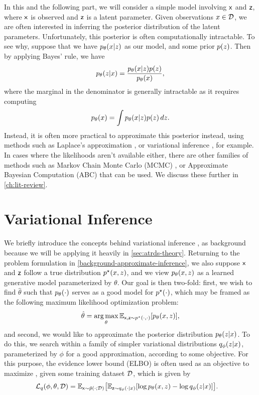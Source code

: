 In this and the following part, we will consider a simple model involving $\mathsf x$ and $\mathsf z$, where $\mathsf x$ is observed and $\mathsf z$ is a latent parameter. Given observations $x\in \mathcal D$, we are often interested in inferring the posterior distribution of the latent parameters. Unfortunately, this posterior is often computationally intractable. To see why, suppose that we have $\pld{x\given z}$ as our model, and some prior $\pd{z}$. Then by applying Bayes' rule, we have
\begin{equation}
    \pld{z\given x} = \frac{\pld{x\given z}\pd{z}}{\pld{x}},
\end{equation}
where the marginal in the denominator is generally intractable as it requires computing
\begin{equation}
    \pld{x} = \int \pld{x\given z}\pd{z} \,dz.
\end{equation}
Instead, it is often more practical to approximate this posterior instead, using methods such as Laplace's approximation \cite{laplace1776}, or variational inference \cite{blei2017variational}, for example. In cases where the likelihoods aren't available either, there are other families of methods such as Markov Chain Monte Carlo (MCMC) \cite{metropolis_1953}, or Approximate Bayesian Computation (ABC) \cite{abc_2013} that can be used. We discuss these further in \cref{ch:lit-review}.


\section{Variational Inference}
\label{background-variational-inference}

We briefly introduce the concepts behind variational inference \cite{blei2017variational}, as background because we will be applying it heavily in \cref{sec:atrds-theory}. Returning to the problem formulation in \cref{background-approximate-inference}, we also suppose $\mathsf x$ and $\mathsf z$ follow a true distribution $\ptd{x,z}$, and we view $\pld{x,z}$ as a learned generative model parameterized by $\theta$. Our goal is then two-fold: first, we wish to find $\hat\theta$ such that $\pld{\cdot}$ serves as a good model for $\ptd{\cdot}$, which may be framed as the following maximum likelihood optimization problem:
\begin{equation}
    \hat\theta = \argmax_{\theta} \EX{\rx,\rz\sim \ptd{\cdot,\cdot}}{\pld{x,z}},
\end{equation}
and second, we would like to approximate the posterior distribution $\pld{z\given x}$. To do this, we search within a family of simpler variational distributions $\qvd{z\given x}$, parameterized by $\phi$ for a good approximation, according to some objective. For this purpose, the evidence lower bound (ELBO) is often used as an objective to maximize \cite{zhang2018advances}, given some training dataset $\mathcal D$, which is given by
\begin{align}
    \elbo{q}{\phi, \theta, \Data}
    &= \EX{\rx \sim \ped{\cdot;\Data}}{ \EX{\rz \sim \qvd{\cdot\given x}}{\log \pld{x,z} - \log \qvd{z\given x}} }.
\end{align}

